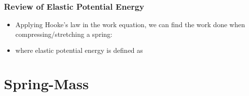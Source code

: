 \documentclass[12pt,compress,aspectratio=169]{beamer}
\begin{document}
\begin{frame}
  \frametitle{Review of Elastic Potential Energy}
  \begin{itemize}
  \item Applying Hooke's law in the work equation, we can find the work done
    when compressing/stretching a spring:

  \item where elastic potential energy is defined as

  \end{itemize}
\end{frame}

\section{Spring-Mass}
\end{document}
